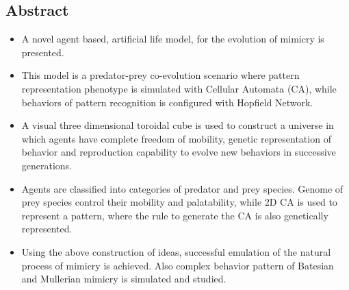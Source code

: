 \documentclass[a0,landscape]{a0poster}
\begin{document}
\begin{multicols}{5} %



\color{Navy} %

\section*{Abstract}

\begin{itemize}
	\item A novel agent based, artificial life model, for the evolution of mimicry is presented.
	\item This model is a predator-prey co-evolution scenario where pattern representation phenotype is simulated with Cellular Automata (CA), while behaviors of pattern recognition is configured with Hopfield Network.
	\item A visual three dimensional toroidal cube is used to construct a universe in which agents have complete freedom of mobility, genetic representation of behavior and reproduction capability to evolve new behaviors in successive generations.
	\item Agents are classified into categories of predator and prey species. Genome of prey species control their mobility and palatability, while 2D CA is used to represent a pattern, where the rule to generate the CA is also genetically represented.
	\item Using the above construction of ideas, successful emulation of the natural process of mimicry is achieved. Also complex behavior pattern of Batesian and Mullerian mimicry is simulated and studied.
\end{itemize}


\end{multicols}
\end{document}

